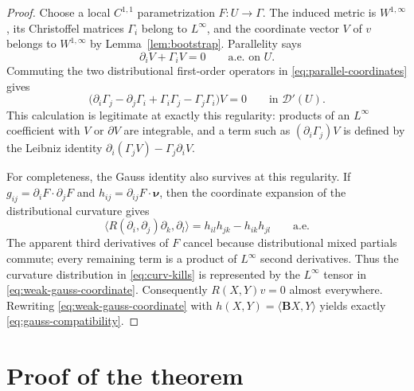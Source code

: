 \documentclass[11pt]{article}
\newcommand{\G}{\Gamma}
\newcommand{\nuG}{\boldsymbol\nu}
\newcommand{\BG}{\mathbf B}
\begin{document}
\begin{proof}
Choose a local $C^{1,1}$ parametrization $F:U\to\G$.  The induced metric is
$W^{1,\infty}$, its Christoffel matrices $\Gamma_i$ belong to
$L^\infty$, and the coordinate vector $V$ of $v$ belongs to
$W^{1,\infty}$ by Lemma~\ref{lem:bootstrap}.  Parallelity says
\begin{equation}\label{eq:parallel-coordinates}
 \partial_iV+\Gamma_iV=0\qquad\text{a.e. on }U.
\end{equation}
Commuting the two distributional first-order operators in
\eqref{eq:parallel-coordinates} gives
\begin{equation}\label{eq:curv-kills}
 \bigl(\partial_i\Gamma_j-\partial_j\Gamma_i
       +\Gamma_i\Gamma_j-\Gamma_j\Gamma_i\bigr)V=0
 \qquad\text{in }\mathcal D'(U).
\end{equation}
This calculation is legitimate at exactly this regularity: products of an
$L^\infty$ coefficient with $V$ or $\partial V$ are integrable, and a term
such as $(\partial_i\Gamma_j)V$ is defined by the Leibniz identity
$\partial_i(\Gamma_jV)-\Gamma_j\partial_iV$.

For completeness, the Gauss identity also survives at this regularity.
If $g_{ij}=\partial_iF\cdot\partial_jF$ and
$h_{ij}=\partial_{ij}F\cdot\nuG$, then the coordinate expansion of the
distributional curvature gives
\begin{equation}\label{eq:weak-gauss-coordinate}
 \langle R(\partial_i,\partial_j)\partial_k,\partial_l\rangle
 =h_{il}h_{jk}-h_{ik}h_{jl}\qquad\text{a.e.}
\end{equation}
The apparent third derivatives of $F$ cancel because distributional mixed
partials commute; every remaining term is a product of $L^\infty$ second
derivatives.  Thus the curvature distribution in \eqref{eq:curv-kills} is
represented by the $L^\infty$ tensor in
\eqref{eq:weak-gauss-coordinate}.  Consequently $R(X,Y)v=0$ almost
everywhere.  Rewriting \eqref{eq:weak-gauss-coordinate} with
$h(X,Y)=\langle\BG X,Y\rangle$ yields exactly
\eqref{eq:gauss-compatibility}.
\end{proof}

\section{Proof of the theorem}
\end{document}
